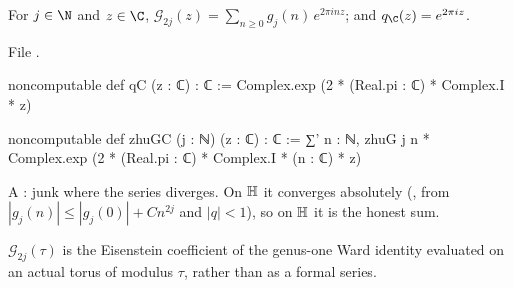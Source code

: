 \begin{definition}\label{l14:def:zhuGC}
For $j\in\N$ and $z\in\C$, $\mathcal G_{2j}(z) = \sum_{n\ge0}g_j(n)\,e^{2\pi inz}$; and $q_{\C}(z) = e^{2\pi iz}$.
\end{definition}
\noindent File .
\begin{leancode}
noncomputable def qC (z : ℂ) : ℂ := Complex.exp (2 * (Real.pi : ℂ) * Complex.I * z)

noncomputable def zhuGC (j : ℕ) (z : ℂ) : ℂ :=
  ∑' n : ℕ, zhuG j n * Complex.exp (2 * (Real.pi : ℂ) * Complex.I * (n : ℂ) * z)
\end{leancode}
\begin{dictionary}
A : junk where the series diverges. On $\mathbb{H}$ it converges absolutely
(, from $|g_j(n)|\le|g_j(0)| + Cn^{2j}$ and $|q|<1$), so on $\mathbb{H}$ it is the honest sum.
\end{dictionary}
\begin{physics}
$\mathcal G_{2j}(\tau)$ is the Eisenstein coefficient of the genus-one Ward identity evaluated on an actual torus of modulus $\tau$, rather than as a formal series.
\end{physics}

